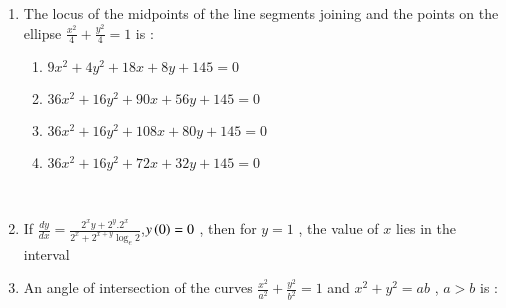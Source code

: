 \documentclass[journal,12pt,twocolumn]{IEEEtran}
\theoremstyle{remark}
\begin{document}
\begin{enumerate}[start=1]
\item 
The locus of the midpoints of the line segments joining  and the points on the ellipse $\frac{x^2}{4}+\frac{y^2}{4}=1$ is :
\begin{enumerate}
\item $9x^2 + 4y^2 + 18x + 8y + 145=0$
\item $36x^2 + 16y^2 +90x +56y +145=0$
\item $36x^2 + 16y^2 +108x +80y +145=0$
\item $36x^2 + 16y^2 +72x +32y +145=0$
\end{enumerate}
\\

\item 
If $\frac{dy}{dx}= \frac{2^xy+2^y.2^x}{2^x+2^{x+y}\log_e 2}$,$y\left(0\right) = 0$ , then for $y=1$ , the value of $x$ lies in the interval 
\begin{enumerate}
\begin{multicols}{2}
\item $\left(1,2\right)$
\item $\left(\frac{1}{2},1 \right]$
\end{multicols}
\end{enumerate}
\begin{enumerate}
\begin{multicols}{2}
\item $\left(2,3\right)$
\item $\left(0,\frac{1}{2}\right]$
\end{multicols}
\end{enumerate}

\newpage

\item 
An angle of intersection of the curves $\frac{x^2}{a^2}+\frac{y^2}{b^2}=1$ and $x^2+y^2=ab$ , $a > b$ is :
\begin{enumerate}
\end{enumerate}
\begin{enumerate}
\end{enumerate}
\\



\end{enumerate}
\end{document}

